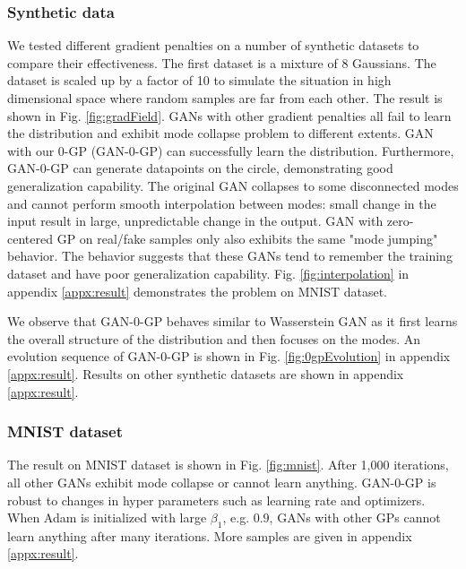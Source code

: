 \documentclass{article} %
\begin{document}
\subsubsection*{Synthetic data}
We tested different gradient penalties on a number of synthetic datasets to compare their effectiveness. The first dataset is a mixture of 8 Gaussians. 
The dataset is scaled up by a factor of 10 to simulate the situation in high dimensional space where random samples are far from each other. The result is shown in Fig. \ref{fig:gradField}. GANs with other gradient penalties all fail to learn the distribution and exhibit mode collapse problem to different extents. 
GAN with our 0-GP (GAN-0-GP) can successfully learn the distribution. Furthermore, GAN-0-GP can generate datapoints on the circle, demonstrating good generalization capability. The original GAN collapses to some disconnected modes and cannot perform smooth interpolation between modes: small change in the input result in large, unpredictable change in the output.  GAN with zero-centered GP on real/fake samples only also exhibits the same "mode jumping" behavior. The behavior suggests that these GANs tend to remember the training dataset and have poor generalization capability. Fig. \ref{fig:interpolation} in appendix \ref{appx:result} demonstrates the problem on MNIST dataset.

We observe that GAN-0-GP behaves similar to Wasserstein GAN as it first learns the overall structure of the distribution and then focuses on the modes. An evolution sequence of GAN-0-GP is shown in Fig. \ref{fig:0gpEvolution} in appendix \ref{appx:result}. Results on other synthetic datasets are shown in appendix \ref{appx:result}.

\subsubsection*{MNIST dataset}
The result on MNIST dataset is shown in Fig. \ref{fig:mnist}. After 1,000 iterations, all other GANs exhibit mode collapse or cannot learn anything. GAN-0-GP is robust to changes in hyper parameters such as learning rate and optimizers. When Adam is initialized with large $\beta_1$, e.g. $0.9$, GANs with other GPs cannot learn anything after many iterations. %
More samples are given in appendix \ref{appx:result}.
\end{document}
